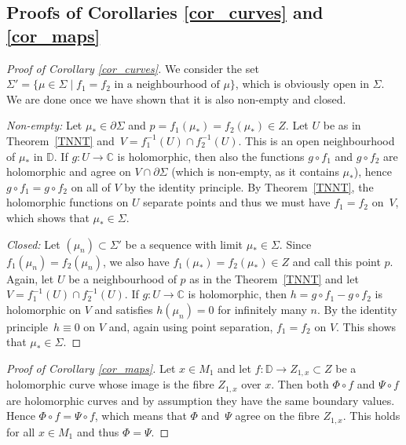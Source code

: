 \documentclass[10pt,a4paper]{amsart}
\numberwithin{equation}{section}
\theoremstyle{definition}
\newcommand{\C}{\mathbb{C}} %
\newcommand{\DD}{\mathbb{D}} %
\newcommand{\1}{{\bf 1}}
\begin{document}
\subsection[Proofs of Corollaries 1.5 and 1.6]{Proofs of Corollaries \ref{cor_curves} and \ref{cor_maps}}

\begin{proof}[Proof of Corollary \ref{cor_curves}]
	We consider the set $\Sigma'=\{\mu \in \Sigma\mid f_1 =f_2 \text{ in a neighbourhood of } \mu\}$,
which is obviously open in $\Sigma$. We are done once we have shown that it is also non-empty and closed.

{\it Non-empty:} Let $\mu_* \in \partial \Sigma$ and $p=f_1(\mu_*)=f_2(\mu_*)\in Z$. Let $U$ be as in Theorem~\ref{TNNT} and~${V=f_1^{-1}(U)\cap f_2^{-1}(U)}$. This is an open neighbourhood of $\mu_*$ in $\DD$. If $g\colon U\to \C$ is holomorphic, then also the functions $g\circ f_1$ and $g\circ f_2$ are holomorphic and agree on $V\cap \partial \Sigma$ (which is non-empty, as it contains $\mu_*$), hence $g\circ f_1 = g\circ f_2$ on all of $V$ by the identity principle. By Theorem~\ref{TNNT}, the holomorphic functions on $U$ separate points and thus we must have $f_1=f_2$ on~$V$, which shows that $\mu_*\in \Sigma$.

{\it Closed:} Let $(\mu_n)\subset \Sigma'$ be a sequence with limit $\mu_*\in \Sigma$. Since $f_1(\mu_n)=f_2(\mu_n)$, we also have $f_1(\mu_*)=f_2(\mu_*)\in Z$ and call this point $p$. Again, let $U$ be a neighbourhood of $p$ as in the Theorem~\ref{TNNT} and let $V=f_1^{-1}(U)\cap f_2^{-1}(U)$. If $g\colon U\to \C$ is holomorphic, then $h=g\circ f_1-g\circ f_2$ is holomorphic on $V$ and satisfies $h(\mu_n)=0$ for infinitely many $n$. By the identity principle~${h\equiv 0}$ on $V$ and, again using point separation, $f_1=f_2$ on $V$. This shows that $\mu_*\in \Sigma$.
\end{proof}


\begin{proof}[Proof of Corollary \ref{cor_maps}]
	Let $x\in M_1$ and let $f\colon \DD\rightarrow Z_{1,x}\subset Z$ be a holomorphic curve whose image is the fibre $Z_{1,x}$ over $x$. Then both $\Phi\circ f$ and $\Psi\circ f$ are holomorphic curves and by assumption they have the same boundary values. Hence $\Phi\circ f = \Psi\circ f$, which means that $\Phi$ and~$\Psi$ agree on the fibre $Z_{1,x}$. This holds for all $x\in M_1$ and thus $\Phi=\Psi$.
\end{proof}
\end{document}
